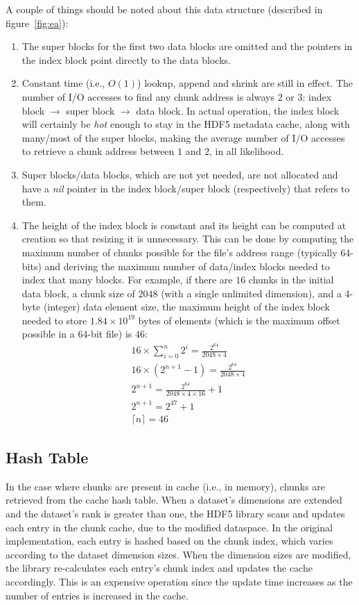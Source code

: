 A couple of things should be noted about this data structure (described in
figure~\ref{fig:ea}):
\begin{enumerate}
\item The super blocks for the first two data blocks are omitted and the pointers
in the index block point directly to the data blocks.
\item Constant time (i.e., $O(1)$) lookup, append and shrink are still in effect.
The number of I/O accesses to find any chunk address is always $2$ or $3$:
index block $\rightarrow$ super block $\rightarrow$ data block. In
actual operation, the index block will certainly be \textit{hot} enough to stay
in the HDF5 metadata cache, along with many/most of the super blocks,
making the average number of I/O accesses to retrieve a chunk address between
$1$ and $2$, in all likelihood.
\item Super blocks/data blocks, which are not yet needed, are not allocated and
have a \textit{nil} pointer in the index block/super block (respectively) that
refers to them.
\item The height of the index block is constant and its height can be computed
at creation so that resizing it is unnecessary. This can be done by computing
the maximum number of chunks possible for the file's address range
(typically 64-bits) and deriving the maximum number of data/index blocks needed
to index that many blocks. For example, if there are $16$ chunks in the initial
data block, a chunk size of $2048$ (with a single unlimited dimension), and a
4-byte (integer) data element size, the maximum height of the index block needed to
store $1.84\times 10^{19}$ bytes of elements (which is the maximum offset
possible in a 64-bit file) is $46$:
\begin{align*}
16\times \sum_{i=0}^{n} 2^{i} = \frac{2^{64}}{2048 \times 4}\\
16\times (2^{n+1}-1) = \frac{2^{64}}{2048 \times 4}\\
2^{n+1} = \frac{2^{64}}{2048 \times 4 \times 16} + 1\\
2^{n+1} = 2^{47} + 1\\
\lceil n \rceil = 46
\end{align*}
\end{enumerate}

\subsection{Hash Table}
In the case where chunks are present in cache (i.e., in memory),
chunks are retrieved from the cache hash table. When a dataset's dimensions are
extended and the dataset's rank is greater than one, the HDF5 library scans
and updates each entry in the chunk cache, due to the modified dataspace.
In the original implementation, each entry is hashed based on the chunk index,
which varies according to the dataset dimension sizes. When the dimension sizes
are modified, the library re-calculates each entry's chunk index and updates
the cache accordingly. This is an expensive operation since the update time
increases as the number of entries is increased in the cache.

